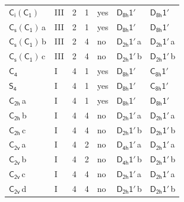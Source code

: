 \documentclass[10pt,a4paper]{article}
\numberwithin{equation}{section}
\newcommand{\grp}[1]{\mathsf{#1}}
\newcommand{\clsletter}[1]{\,{\scriptsize\color{black!55}#1}}
\begin{document}
{\begin{longtable}{@{}llrrlll@{}}
\href{S2-C1.pdf}{$\grp{C_{i}}(\grp{C_{1}})$} & III & 2 & 1 & yes & \href{D8h-1p.pdf}{$\grp{D_{8h}1'}$} & \href{D8h-1p.pdf}{$\grp{D_{8h}1'}$}\\
\href{C1v-C1.pdf}{$\grp{C_{s}}(\grp{C_{1}})$}\clsletter{a} & III & 2 & 1 & yes & \href{D8h-1p.pdf}{$\grp{D_{8h}1'}$} & \href{D8h-1p.pdf}{$\grp{D_{8h}1'}$}\\
\href{C1v-C1.pdf}{$\grp{C_{s}}(\grp{C_{1}})$}\clsletter{b} & III & 2 & 4 & no & \href{D2h-1p.pdf}{$\grp{D_{2h}1'}$}\clsletter{a} & \href{D2h-1p.pdf}{$\grp{D_{2h}1'}$}\clsletter{a}\\
\href{C1v-C1.pdf}{$\grp{C_{s}}(\grp{C_{1}})$}\clsletter{c} & III & 2 & 4 & no & \href{D2h-1p.pdf}{$\grp{D_{2h}1'}$}\clsletter{b} & \href{D2h-1p.pdf}{$\grp{D_{2h}1'}$}\clsletter{b}\\
\href{../../../rotation/data/pdf/C4.pdf}{$\grp{C_{4}}$} & I & 4 & 1 & yes & \href{D8h-1p.pdf}{$\grp{D_{8h}1'}$} & \href{C8h-1p.pdf}{$\grp{C_{8h}1'}$}\\
\href{../../../rotation/data/pdf/S4.pdf}{$\grp{S_{4}}$} & I & 4 & 1 & yes & \href{D8h-1p.pdf}{$\grp{D_{8h}1'}$} & \href{C8h-1p.pdf}{$\grp{C_{8h}1'}$}\\
\href{../../../rotation/data/pdf/C2h.pdf}{$\grp{C_{2h}}$}\clsletter{a} & I & 4 & 1 & yes & \href{D8h-1p.pdf}{$\grp{D_{8h}1'}$} & \href{D8h-1p.pdf}{$\grp{D_{8h}1'}$}\\
\href{../../../rotation/data/pdf/C2h.pdf}{$\grp{C_{2h}}$}\clsletter{b} & I & 4 & 4 & no & \href{D2h-1p.pdf}{$\grp{D_{2h}1'}$}\clsletter{a} & \href{D2h-1p.pdf}{$\grp{D_{2h}1'}$}\clsletter{a}\\
\href{../../../rotation/data/pdf/C2h.pdf}{$\grp{C_{2h}}$}\clsletter{c} & I & 4 & 4 & no & \href{D2h-1p.pdf}{$\grp{D_{2h}1'}$}\clsletter{b} & \href{D2h-1p.pdf}{$\grp{D_{2h}1'}$}\clsletter{b}\\
\href{../../../rotation/data/pdf/C2v.pdf}{$\grp{C_{2v}}$}\clsletter{a} & I & 4 & 2 & no & \href{D4h-1p.pdf}{$\grp{D_{4h}1'}$}\clsletter{a} & \href{D2h-1p.pdf}{$\grp{D_{2h}1'}$}\clsletter{a}\\
\href{../../../rotation/data/pdf/C2v.pdf}{$\grp{C_{2v}}$}\clsletter{b} & I & 4 & 2 & no & \href{D4h-1p.pdf}{$\grp{D_{4h}1'}$}\clsletter{b} & \href{D2h-1p.pdf}{$\grp{D_{2h}1'}$}\clsletter{b}\\
\href{../../../rotation/data/pdf/C2v.pdf}{$\grp{C_{2v}}$}\clsletter{c} & I & 4 & 4 & no & \href{D2h-1p.pdf}{$\grp{D_{2h}1'}$}\clsletter{a} & \href{D2h-1p.pdf}{$\grp{D_{2h}1'}$}\clsletter{a}\\
\href{../../../rotation/data/pdf/C2v.pdf}{$\grp{C_{2v}}$}\clsletter{d} & I & 4 & 4 & no & \href{D2h-1p.pdf}{$\grp{D_{2h}1'}$}\clsletter{b} & \href{D2h-1p.pdf}{$\grp{D_{2h}1'}$}\clsletter{b}\\

\end{longtable}}
\end{document}
